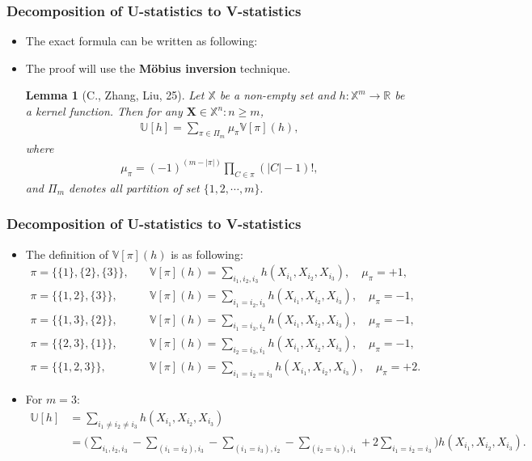 \documentclass[9pt]{beamer}
\theoremstyle{mystyle}
\newtheorem{mylemma}{Lemma}
\theoremstyle{mystyletwo}
\def\bbX{\mathbb{X}}
\def\bbR{\mathbb{R}}
\def\bbR{\mathbb{R}}
\newcommand{\sPi}{\pi}
\newcommand{\ustat}{\mathbb{U}}
\newcommand{\vstat}{\mathbb{V}}
\newcommand{\partition}{\Pi}
\newcommand{\partitionp}[1]{\partition_{#1}}
\begin{document}
\begin{frame}
    \frametitle{Decomposition of U-statistics to V-statistics}
    \begin{itemize}
        \item The exact formula  can be written as following:
        \item The proof will use the \textbf{M\"obius inversion} technique.
              \begin{mylemma}[C., Zhang, Liu, 25]
                  \label{lem:decomp_u_to_v}
                  Let $\bbX$ be a non-empty set and $h: \bbX^{m} \rightarrow \bbR$ be a kernel function. Then for any $\bm{X} \in \bbX^n: n \geq m$,
                  \begin{align*}
                      \ustat[h] = \sum_{\sPi \in \partitionp{m}}
                      \mu_\sPi \vstat[\sPi](h),
                  \end{align*}
                  where
                  \begin{align*}
                      \mu_\sPi = (-1)^{(m-|\sPi|)} \prod_{C \in \sPi} (|C| - 1)!,
                  \end{align*}
                  and $\partitionp{m}$ denotes all partition of set $\{1,2,\cdots,m\}.$
              \end{mylemma}

    \end{itemize}
\end{frame}

\begin{frame}
    \frametitle{Decomposition of U-statistics to V-statistics}
    \begin{itemize}
        \item The definition of $\vstat[\sPi](h)$ is as following:
     \begin{align*}
     \pi = \{\{1\},\{2\},\{3\}\},\quad & \mathbb{V}[\pi](h) = \sum_{i_1,i_2,i_3} h(X_{i_1},X_{i_2},X_{i_3}), \quad \mu_{\pi} = +1,\\
     \pi = \{\{1,2\},\{3\}\},\quad & \mathbb{V}[\pi](h) = \sum_{i_1=i_2,i_3} h(X_{i_1},X_{i_2},X_{i_3}), \quad \mu_{\pi} = -1, \\
     \pi = \{\{1,3\},\{2\}\},\quad & \mathbb{V}[\pi](h) = \sum_{i_1=i_3,i_2} h(X_{i_1},X_{i_2},X_{i_3}), \quad \mu_{\pi} = -1, \\
     \pi = \{\{2,3\},\{1\}\},\quad & \mathbb{V}[\pi](h) = \sum_{i_2=i_3,i_1} h(X_{i_1},X_{i_2},X_{i_3}), \quad \mu_{\pi} = -1, \\
     \pi = \{\{1,2,3\}\},\quad & \mathbb{V}[\pi](h) = \sum_{i_1=i_2=i_3} h(X_{i_1},X_{i_2},X_{i_3}),\quad \mu_{\pi} = +2.
    \end{align*}

    \item For $m = 3$:
    \begin{align*}
        \mathbb{U}[h] & = \sum_{i_1 \neq i_2 \neq i_3} h(X_{i_1},X_{i_2},X_{i_3}) \\
 & = \Big(\sum_{i_1,i_2,i_3} - \sum_{(i_1=i_2), i_3 } - \sum_{(i_1=i_3), i_2 } - \sum_{(i_2=i_3), i_1 } + 2 \sum_{i_1=i_2=i_3}\Big) h(X_{i_1},X_{i_2},X_{i_3}).
    \end{align*}
    \end{itemize}
\end{frame}
\end{document}
